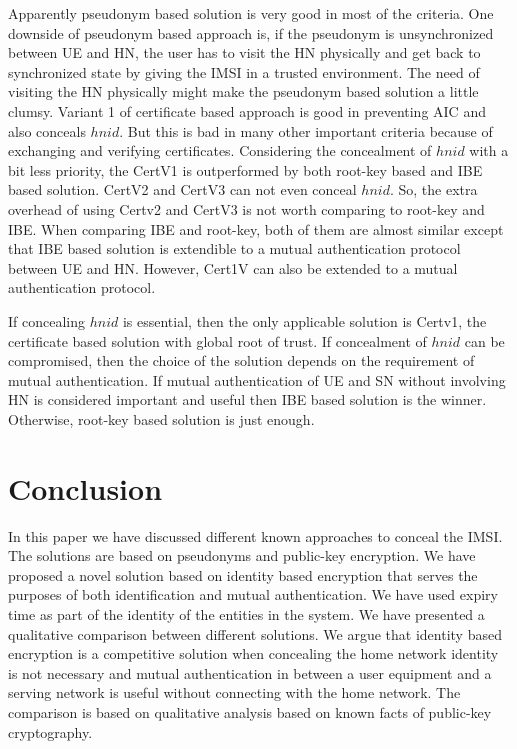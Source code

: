 \documentclass{river-journal}
\begin{document}
Apparently pseudonym based solution is very good in most of the criteria. One downside of pseudonym based approach is, if the pseudonym is unsynchronized between UE and HN, the user has to visit the HN physically and get back to synchronized state by giving the IMSI in a trusted environment. The need of visiting the HN physically might make the pseudonym based solution a little clumsy. Variant 1 of certificate based approach is good in preventing AIC and also conceals $hnid$. But this is bad in many other important criteria because of exchanging and verifying certificates. Considering the concealment of $hnid$ with a bit less priority, the CertV1 is outperformed by both root-key based and IBE based solution. CertV2 and CertV3 can not even conceal $hnid$. So, the extra overhead of using Certv2 and CertV3 is not worth comparing to root-key and IBE. When comparing IBE and root-key, both of them are almost similar except that IBE based solution is extendible to a mutual authentication protocol between UE and HN. However, Cert1V can also be extended to a mutual authentication protocol. 


If concealing $hnid$ is essential, then the only applicable solution is Certv1, the certificate based solution with global root of trust. If concealment of $hnid$ can be compromised, then the choice  of the solution depends on the requirement of mutual authentication. If mutual authentication of UE and SN without involving HN is considered important and useful then IBE based solution is the winner. Otherwise, root-key based solution is just enough.


\section{Conclusion}
\label{sec:conclusion}In this paper we have discussed different known approaches to conceal the IMSI. The solutions  are based on pseudonyms and public-key encryption. We have proposed a novel solution based on identity based encryption that serves the purposes of both identification and mutual authentication. We have used expiry time as part of the identity of the entities in the system. We have presented a qualitative comparison between different  solutions. We argue that identity based encryption is a competitive solution when concealing the home network identity is not necessary and mutual authentication in between a user equipment and a serving network is useful without connecting with the home network. The comparison is based on qualitative analysis based on known facts of public-key cryptography.
\end{document}
